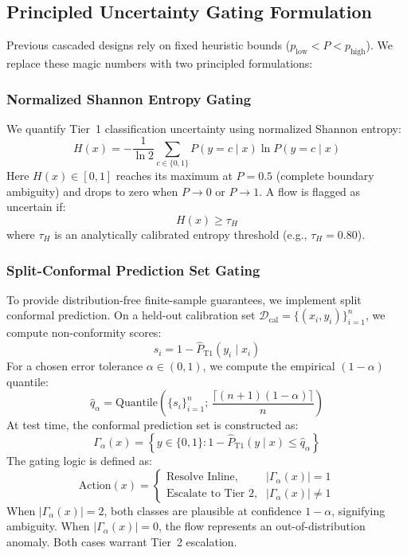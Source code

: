 \documentclass[conference]{IEEEtran}
\begin{document}
\subsection{Principled Uncertainty Gating Formulation}
Previous cascaded designs rely on fixed heuristic bounds ($p_{\text{low}} < P < p_{\text{high}}$). We replace these magic numbers with two principled formulations:

\subsubsection{Normalized Shannon Entropy Gating}
We quantify Tier~1 classification uncertainty using normalized Shannon entropy:
\begin{equation}
H(x) = -\frac{1}{\ln 2} \sum_{c \in \{0, 1\}} P(y=c \mid x) \ln P(y=c \mid x)
\label{eq:entropy}
\end{equation}
Here $H(x) \in [0, 1]$ reaches its maximum at $P=0.5$ (complete boundary ambiguity) and drops to zero when $P \to 0$ or $P \to 1$. A flow is flagged as uncertain if:
\begin{equation}
H(x) \ge \tau_H
\label{eq:entropy_gate}
\end{equation}
where $\tau_H$ is an analytically calibrated entropy threshold (e.g., $\tau_H = 0.80$).

\subsubsection{Split-Conformal Prediction Set Gating}
To provide distribution-free finite-sample guarantees, we implement split conformal prediction. On a held-out calibration set $\mathcal{D}_{\text{cal}} = \{(x_i, y_i)\}_{i=1}^n$, we compute non-conformity scores:
\begin{equation}
s_i = 1 - \hat{P}_{\text{T1}}(y_i \mid x_i)
\label{eq:nonconformity}
\end{equation}
For a chosen error tolerance $\alpha \in (0, 1)$, we compute the empirical $(1-\alpha)$ quantile:
\begin{equation}
\hat{q}_\alpha = \text{Quantile}\left( \{s_i\}_{i=1}^n; \, \frac{\lceil (n+1)(1-\alpha) \rceil}{n} \right)
\label{eq:conformal_quantile}
\end{equation}
At test time, the conformal prediction set is constructed as:
\begin{equation}
\Gamma_\alpha(x) = \left\{ y \in \{0, 1\} : 1 - \hat{P}_{\text{T1}}(y \mid x) \le \hat{q}_\alpha \right\}
\label{eq:conformal_set}
\end{equation}
The gating logic is defined as:
\begin{equation}
\text{Action}(x) = \begin{cases}
\text{Resolve Inline}, & |\Gamma_\alpha(x)| = 1 \\
\text{Escalate to Tier 2}, & |\Gamma_\alpha(x)| \ne 1
\end{cases}
\label{eq:conformal_action}
\end{equation}
When $|\Gamma_\alpha(x)| = 2$, both classes are plausible at confidence $1-\alpha$, signifying ambiguity. When $|\Gamma_\alpha(x)| = 0$, the flow represents an out-of-distribution anomaly. Both cases warrant Tier~2 escalation.
\end{document}
